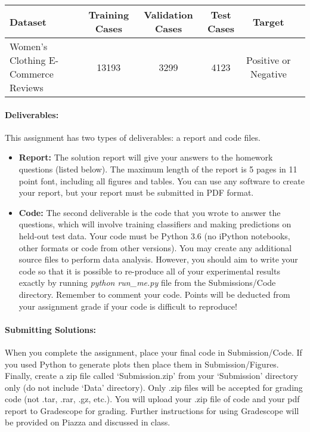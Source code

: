 \documentclass[letterpaper]{article}
\begin{document}
\begin{table}[h!]
\center
\begin{tabular}{|l|c|c|c|c|c|}\hline
Dataset & Training Cases & Validation Cases & Test Cases & Target \\\hline\hline
Women's Clothing E-Commerce Reviews & 13193 & 3299 & 4123 & Positive or Negative \\\hline
\end{tabular}
\end{table}

\paragraph*{Deliverables:} This assignment has two types of deliverables: a report and code files. 
\begin{itemize}
\item \textbf{Report: } The solution report will give your answers to the homework questions (listed below). The maximum length of the report is 5 pages in 11 point font, including all figures and tables. You can use any software to create your report, but your report must be submitted in PDF format. 

\item \textbf{Code: } The second deliverable is the code that you wrote to answer the questions, which will involve training classifiers and making predictions on held-out test data. Your code must be Python 3.6 (no iPython notebooks, other formats or code from other versions). You may create any additional source files to perform data analysis. However, you should aim to write your code so that it is possible to re-produce all of your experimental results exactly by running \textit{python run\_me.py} file from the Submissions/Code directory. Remember to comment your code. Points will be deducted from your assignment grade if your code is difficult to reproduce!

\end{itemize}

\paragraph*{Submitting Solutions:} When you complete the assignment, place your final code in Submission/Code. If you used Python to generate plots then place them in Submission/Figures. Finally, create a zip file called `Submission.zip' from your `Submission' directory only (do not include `Data' directory). Only .zip files will be accepted for grading code (not .tar, .rar, .gz, etc.). You will upload your .zip file of code and your pdf report to Gradescope for grading. Further instructions for using Gradescope will be provided on Piazza and discussed in class.
\end{document}
